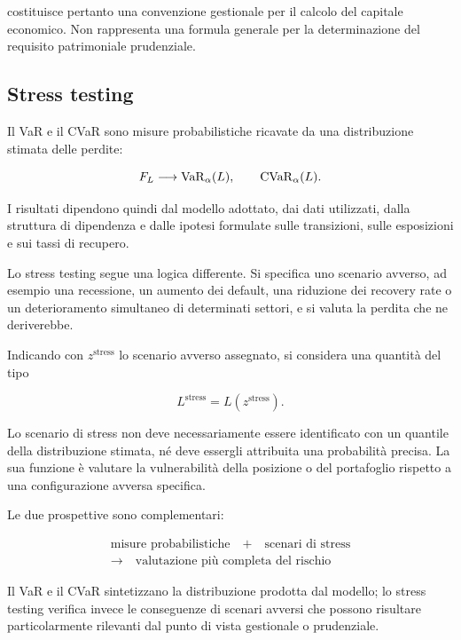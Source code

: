 costituisce pertanto una convenzione gestionale per il calcolo del
capitale economico. Non rappresenta una formula generale per la
determinazione del requisito patrimoniale prudenziale.

\subsection{Stress testing}

\label{subsec:cap9-stress-testing}

Il VaR e il CVaR sono misure probabilistiche ricavate da una
distribuzione stimata delle perdite:

\[
F_L
\longrightarrow
\operatorname{VaR}_{\alpha}(L),
\qquad
\operatorname{CVaR}_{\alpha}(L).
\]

I risultati dipendono quindi dal modello adottato, dai dati utilizzati,
dalla struttura di dipendenza e dalle ipotesi formulate sulle
transizioni, sulle esposizioni e sui tassi di recupero.

Lo stress testing segue una logica differente. Si specifica uno
scenario avverso, ad esempio una recessione, un aumento dei default,
una riduzione dei recovery rate o un deterioramento simultaneo di
determinati settori, e si valuta la perdita che ne deriverebbe.

Indicando con $z^{\mathrm{stress}}$ lo scenario avverso assegnato, si
considera una quantit\`{a} del tipo

\[
L^{\mathrm{stress}}
=
L\left(z^{\mathrm{stress}}\right).
\]

Lo scenario di stress non deve necessariamente essere identificato
con un quantile della distribuzione stimata, n\'{e} deve essergli
attribuita una probabilit\`{a} precisa. La sua funzione \`{e} valutare
la vulnerabilit\`{a} della posizione o del portafoglio rispetto a una
configurazione avversa specifica.

Le due prospettive sono complementari:

\[
\boxed{
\begin{array}{c}
\text{misure probabilistiche}
\quad+\quad
\text{scenari di stress}
\\[-0.5mm]
\longrightarrow
\quad
\text{valutazione pi\`{u} completa del rischio}
\end{array}
}
\]

Il VaR e il CVaR sintetizzano la distribuzione prodotta dal modello; lo
stress testing verifica invece le conseguenze di scenari avversi che
possono risultare particolarmente rilevanti dal punto di vista
gestionale o prudenziale.

